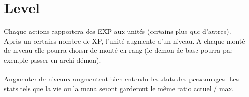 \newpage
\section{Level}

\paragraph{} Chaque actions rapportera des EXP aux unités (certains plus que d'autres). Après un certains nombre de XP, l'unité augmente d'un niveau. A chaque monté de niveau elle pourra choisir de monté en rang (le démon de base pourra par exemple passer en archi démon).
\paragraph{} Augmenter de niveaux augmentent bien entendu les stats des personnages. Les stats tels que la vie ou la mana seront garderont le même ratio actuel / max.
